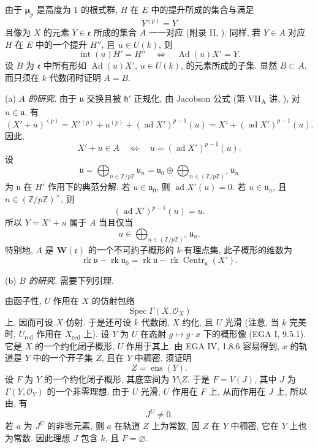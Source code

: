 由于 \(\boldsymbol\mu_p\) 是高度为 \(1\) 的根式群,
\(H\) 在 \(E\) 中的提升所成的集合与满足
\[
  Y^{(p)}=Y
\]
且像为 \(X\) 的元素 \(Y\in\mathfrak e\) 所成的集合 \(A\) 一一对应
(附录 II, ).
同样, 若 \(Y\in A\) 对应 \(H\) 在 \(E\) 中的一个提升 \(H''\), 且 \(u\in U(k)\), 则
\[
  \operatorname{int}(u)H'=H''
  \quad\Longleftrightarrow\quad
  \operatorname{Ad}(u)X'=Y.
\]
设 \(B\) 为 \(\mathfrak e\) 中所有形如 \(\operatorname{Ad}(u)X'\),
\(u\in U(k)\), 的元素所成的子集.
显然 \(B\subset A\), 而只须在 \(k\) 代数闭时证明 \(A=B\).

\smallskip
\noindent
(a) \emph{\(A\) 的研究.}
由于 \(\mathfrak u\) 交换且被 \(\mathfrak h'\) 正规化,
由 Jacobson 公式 (第 VII\textsubscript{A} 讲, ),
对 \(u\in\mathfrak u\), 有
\[
  (X'+u)^{(p)}
   =X'{}^{(p)}+u^{(p)}
      +(\operatorname{ad}X')^{p-1}(u)
   =X'+(\operatorname{ad}X')^{p-1}(u).
\]
因此,
\[
  X'+u\in A
  \quad\Longleftrightarrow\quad
  u=(\operatorname{ad}X')^{p-1}(u).
\]
设
\[
  \mathfrak u
   =\bigoplus_{n\in\mathbb Z/p\mathbb Z}\mathfrak u_n
   =\mathfrak u_0\oplus
      \bigoplus_{n\in(\mathbb Z/p\mathbb Z)^\times}\mathfrak u_n
\]
为 \(\mathfrak u\) 在 \(H'\) 作用下的典范分解.
若 \(u\in\mathfrak u_0\), 则 \(\operatorname{ad}X'(u)=0\).
若 \(u\in\mathfrak u_n\), 且 \(n\in(\mathbb Z/p\mathbb Z)^\times\), 则
\[
  (\operatorname{ad}X')^{p-1}(u)=u.
\]
所以 \(Y=X'+u\) 属于 \(A\) 当且仅当
\[
  u\in
  \bigoplus_{n\in(\mathbb Z/p\mathbb Z)^\times}\mathfrak u_n.
\]
特别地, \(A\) 是 \(\mathbf W(\mathfrak e)\) 的一个不可约子概形的 \(k\)-有理点集,
此子概形的维数为
\[
  \operatorname{rk}\mathfrak u-\operatorname{rk}\mathfrak u_0
  =
  \operatorname{rk}\mathfrak u
  -\operatorname{rk}\operatorname{Centr}_{\mathfrak u}(X').
\]

\smallskip
\noindent
(b) \emph{\(B\) 的研究.}
需要下列引理.


由函子性, \(U\) 作用在 \(X\) 的仿射包络
\[
  \operatorname{Spec}\Gamma(X,\mathcal O_X)
\]
上, 因而可设 \(X\) 仿射.
于是还可设 \(k\) 代数闭, \(X\) 约化, 且 \(U\) 光滑
(注意, 当 \(k\) 完美时, \(U_{\mathrm{red}}\) 作用在 \(X_{\mathrm{red}}\) 上).
设 \(Y\) 为 \(U\) 在态射 \(g\mapsto g\cdot x\) 下的概形像 (EGA I, 9.5.1).
它是 \(X\) 的一个约化闭子概形, \(U\) 作用于其上.
由 EGA IV, 1.8.6 容易得到, \(x\) 的轨道是 \(Y\) 中的一个开子集 \(Z\), 且在 \(Y\) 中稠密.
须证明
\[
  Z=\operatorname{ens}(Y).
\]
设 \(F\) 为 \(Y\) 的一个约化闭子概形, 其底空间为 \(Y\setminus Z\).
于是 \(F=V(J)\), 其中 \(J\) 为 \(\Gamma(Y,\mathcal O_Y)\) 的一个非零理想.
由于 \(U\) 光滑, \(U\) 作用在 \(F\) 上, 从而作用在 \(J\) 上,
所以由, 有
\[
  J^U\ne0.
\]
若 \(a\) 为 \(J^U\) 的非零元素, 则 \(a\) 在轨道 \(Z\) 上为常数,
因 \(Z\) 在 \(Y\) 中稠密, 它在 \(Y\) 上也为常数.
因此理想 \(J\) 包含 \(k\), 且 \(F=\varnothing\).

